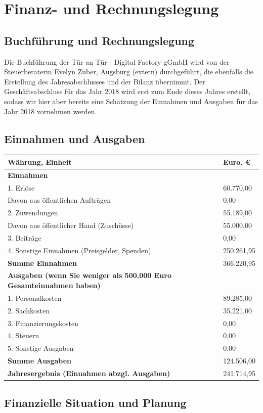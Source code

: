 \documentclass[12pt, a4paper]{article} %
\begin{document}
\hypertarget{finanz--und-rechnungslegung}{%
\section{Finanz- und
Rechnungslegung}\label{finanz--und-rechnungslegung}}

\hypertarget{buchfuxfchrung-und-rechnungslegung}{%
\subsection{Buchführung und
Rechnungslegung}\label{buchfuxfchrung-und-rechnungslegung}}

Die Buchführung der Tür an Tür - Digital Factory gGmbH wird von der
Steuerberaterin Evelyn Zuber, Augsburg (extern) durchgeführt, die
ebenfalls die Erstellung des Jahresabschlusses und der Bilanz übernimmt.
Der Geschäftsabschluss für das Jahr 2018 wird erst zum Ende dieses
Jahres erstellt, sodass wir hier aber bereits eine Schätzung der
Einnahmen und Ausgaben für das Jahr 2018 vornehmen werden.

\hypertarget{einnahmen-und-ausgaben}{%
\subsection{Einnahmen und Ausgaben}\label{einnahmen-und-ausgaben}}

\begin{tabularx}{\textwidth}{Xp{2cm}}
\toprule
\textbf{Währung, Einheit} & \textbf{Euro, \euro}\tabularnewline
\midrule
\textbf{Einnahmen} &\tabularnewline
1. Erlöse & 60.770,00\tabularnewline
Davon aus öffentlichen Aufträgen & 0,00\tabularnewline
2. Zuwendungen & 55.189,00\tabularnewline
Davon aus öffentlicher Hand (Zuschüsse) & 55.000,00\tabularnewline
3. Beiträge & 0,00\tabularnewline
4. Sonstige Einnahmen (Preisgelder, Spenden) & 250.261,95\tabularnewline
\textbf{Summe Einnahmen} & 366.220,95\tabularnewline
\midrule
\textbf{Ausgaben (wenn Sie weniger als 500.000 Euro Gesamteinnahmen
haben)} &\tabularnewline
1. Personalkosten & 89.285,00\tabularnewline
2. Sachkosten & 35.221,00\tabularnewline
3. Finanzierungskosten & 0,00\tabularnewline
4. Steuern & 0,00\tabularnewline
5. Sonstige Ausgaben & 0,00\tabularnewline
\textbf{Summe Ausgaben} & 124.506,00\tabularnewline
\midrule
\textbf{Jahresergebnis (Einnahmen abzgl. Ausgaben)} &
241.714,95\tabularnewline
\bottomrule
\end{tabularx}

\hypertarget{finanzielle-situation-und-planung}{%
\subsection{Finanzielle Situation und
Planung}\label{finanzielle-situation-und-planung}}
\end{document}
